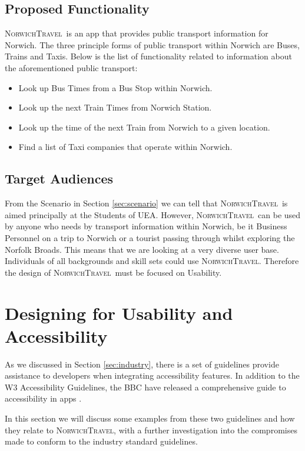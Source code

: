 \documentclass[cmpstyle]{ueacmpstyle}
\newcommand{\nt}{\textsc{NorwichTravel}}
\begin{document}
		\subsection{Proposed Functionality} \label{sec:prop-func}
		\nt \ is an app that provides public transport information for Norwich. The three principle forms of public transport within Norwich are Buses, Trains and Taxis. Below is the list of functionality related to information about the aforementioned public transport:
			\begin{itemize}
				\item Look up Bus Times from a Bus Stop within Norwich.
				\item Look up the next Train Times from Norwich Station.
				\item Look up the time of the next Train from Norwich to a given location.
				\item Find a list of Taxi companies that operate within Norwich. 
			\end{itemize} 
		
		\subsection{Target Audiences} \label{sec:target}
		From the Scenario in Section \ref{sec:scenario} we can tell that \nt \ is aimed principally at the Students of UEA. However, \nt \ can be used by anyone who needs by transport information within Norwich, be it Business Personnel on a trip to Norwich or a tourist passing through whilst exploring the Norfolk Broads. This means that we are looking at a very diverse user base. Individuals of all backgrounds and skill sets could use \nt. Therefore the design of \nt \ must be focused on Usability. 
		
	\section{Designing for Usability and Accessibility} \label{sec:design}
	As we discussed in Section \ref{sec:industry}, there is a set of guidelines provide assistance to developers when integrating accessibility features. In addition to the W3 Accessibility Guidelines, the BBC have released a comprehensive guide to accessibility in apps \citep{bbcguide}.
	
	In this section we will discuss some examples from these two guidelines and how they relate to \nt, with a further investigation into the compromises made to conform to the industry standard guidelines.
	
\end{document}
